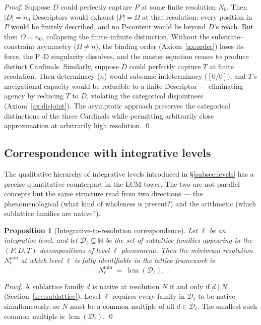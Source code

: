 \documentclass[11pt,a4paper]{article}
\newtheorem{proposition}[theorem]{Proposition}
\theoremstyle{definition}
\theoremstyle{remark}
\newcommand{\N}{\mathbb{N}}
\DeclareMathOperator{\lcm}{lcm}
\begin{document}
\begin{proof}
Suppose $D$ could perfectly capture $P$ at some finite resolution $N_{0}$. Then $|D| = n_{0}$ Descriptors would exhaust $|P| = \Omega$ at that resolution: every position in $P$ would be finitely described, and no P-content would lie beyond $D$'s reach. But then $\Omega = n_{0}$, collapsing the finite--infinite distinction. Without the substrate--constraint asymmetry ($\Omega \neq n$), the binding order (Axiom~\ref{ax:order}) loses its force, the P--D singularity dissolves, and the master equation ceases to produce distinct Cardinals. Similarly, suppose $D$ could perfectly capture $T$ at finite resolution. Then determinacy ($n$) would subsume indeterminacy ($[0/0]$), and $T$'s navigational capacity would be reducible to a finite Descriptor --- eliminating agency by reducing $T$ to $D$, violating the categorical disjointness (Axiom~\ref{ax:disjoint}). The asymptotic approach preserves the categorical distinctions of the three Cardinals while permitting arbitrarily close approximation at arbitrarily high resolution. \qed
\end{proof}

\subsection{Correspondence with integrative levels}\label{subsec:levels-tower}

The qualitative hierarchy of integrative levels introduced in \S\ref{subsec:levels} has a precise quantitative counterpart in the LCM tower. The two are not parallel concepts but the same structure read from two directions --- the phenomenological (what kind of wholeness is present?) and the arithmetic (which sublattice families are native?).

\begin{proposition}[Integrative-to-resolution correspondence]\label{prop:int-resolution}
Let $\ell$ be an integrative level, and let $\mathcal{D}_{\ell}\subseteq\N$ be the set of sublattice families appearing in the $(P,D,T)$ decompositions of level-$\ell$ phenomena. Then the minimum resolution $N_{\ell}^{\min}$ at which level $\ell$ is fully identifiable in the lattice framework is
\[
\boxed{\;N_{\ell}^{\min} \;=\; \lcm(\mathcal{D}_{\ell}).\;}
\]
\end{proposition}

\begin{proof}
A sublattice family $d$ is native at resolution $N$ if and only if $d\mid N$ (Section~\ref{sec:sublattice}). Level $\ell$ requires every family in $\mathcal{D}_{\ell}$ to be native simultaneously, so $N$ must be a common multiple of all $d\in\mathcal{D}_{\ell}$. The smallest such common multiple is $\lcm(\mathcal{D}_{\ell})$. \qed
\end{proof}
\end{document}

